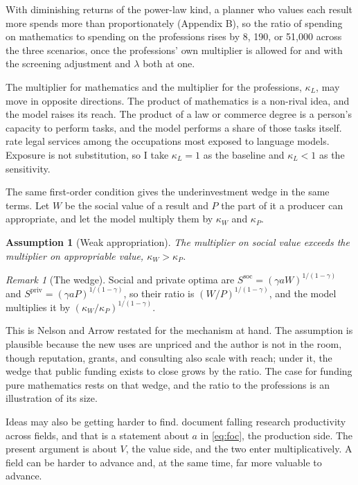 \documentclass[11pt]{article}
\newtheorem{assumption}{Assumption}
\theoremstyle{definition}
\theoremstyle{remark}
\newtheorem{remark}{Remark}
\begin{document}
With diminishing returns of the power-law kind, a planner who values each result more spends more than proportionately (Appendix B), so the ratio of spending on mathematics to spending on the professions rises by 8, 190, or 51{,}000 across the three scenarios, once the professions' own multiplier is allowed for and with the screening adjustment and $\lambda$ both at one.

The multiplier for mathematics and the multiplier for the professions, $\kappa_L$, may move in opposite directions. The product of mathematics is a non-rival idea, and the model raises its reach. The product of a law or commerce degree is a person's capacity to perform tasks, and the model performs a share of those tasks itself. \citet{eloundou2023} rate legal services among the occupations most exposed to language models. Exposure is not substitution, so I take $\kappa_L = 1$ as the baseline and $\kappa_L < 1$ as the sensitivity.

The same first-order condition gives the underinvestment wedge in the same terms. Let $W$ be the social value of a result and $P$ the part of it a producer can appropriate, and let the model multiply them by $\kappa_W$ and $\kappa_P$.

\begin{assumption}[Weak appropriation]
The multiplier on social value exceeds the multiplier on appropriable value, $\kappa_W > \kappa_P$.
\end{assumption}

\begin{remark}[The wedge]
Social and private optima are $S^{\mathrm{soc}} = (\gamma a W)^{1/(1-\gamma)}$ and $S^{\mathrm{priv}} = (\gamma a P)^{1/(1-\gamma)}$, so their ratio is $(W/P)^{1/(1-\gamma)}$, and the model multiplies it by $(\kappa_W / \kappa_P)^{1/(1-\gamma)}$.
\end{remark}

This is Nelson and Arrow restated for the mechanism at hand. The assumption is plausible because the new uses are unpriced and the author is not in the room, though reputation, grants, and consulting also scale with reach; under it, the wedge that public funding exists to close grows by the ratio. The case for funding pure mathematics rests on that wedge, and the ratio to the professions is an illustration of its size.

Ideas may also be getting harder to find. \citet{bloom2020} document falling research productivity across fields, and that is a statement about $a$ in \eqref{eq:foc}, the production side. The present argument is about $V$, the value side, and the two enter multiplicatively. A field can be harder to advance and, at the same time, far more valuable to advance.
\end{document}
